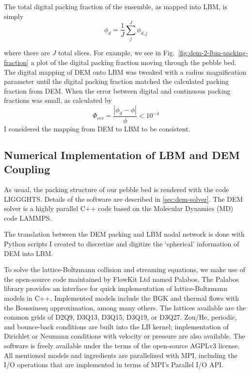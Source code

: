 The total digital packing fraction of the ensemble, as mapped into LBM, is simply
\begin{equation}
	\phi_d = \frac{1}{J}\sum_j^J\phi_{d,j}
\end{equation}

where there are $J$ total slices. For example, we see in Fig.~\ref{fig:dem-2-lbm-packing-fraction} a plot of the digital packing fraction moving through the pebble bed. The digital mapping of DEM onto LBM was tweaked with a radius magnification parameter until the digital packing fraction matched the calculated packing fraction from DEM. When the error between digital and continuous packing fractions was small, as calculated by
\begin{equation}
	\Phi_{err} = \frac{|\phi_d - \phi|}{\phi} < 10^{-4}
\end{equation}
I considered the mapping from DEM to LBM to be consistent.
\FloatBarrier


\subsection{Numerical Implementation of LBM and DEM Coupling}\label{sec:lbm-solver}

As usual, the packing structure of our pebble bed is rendered with the code LIGGGHTS. Details of the software are described in \cref{sec:dem-solver}. The DEM solver is a highly parallel C++ code based on the Molecular Dynamics (MD) code LAMMPS.\cite{Plimpton1995} 

The translation between the DEM packing and LBM nodal network is done with Python scripts I created to discretize and digitize the `spherical' information of DEM into LBM.

To solve the lattice-Boltzmann collision and streaming equations, we make use of the open-source code maintained by FlowKit Ltd named Palabos.\cite{Flow} The Palabos library provides an interface for quick implementation of lattice-Boltzmann models in C++. Implemented models include the BGK and thermal flows with the Boussinesq approximation, among many others. The lattices available are the common grids of D2Q9, D3Q13, D3Q15, D3Q19, or D3Q27. Zou/He, periodic, and bounce-back conditions are built into the LB kernel; implementation of Dirichlet or Neumann conditions with velocity or pressure are also available. The software is freely available under the terms of the open-source AGPLv3 license.\cite{FreeSoftwareFoundationInc.2007} All mentioned models and ingredients are parallelized with MPI, including the I/O operations that are implemented in terms of MPI’s Parallel I/O API.




